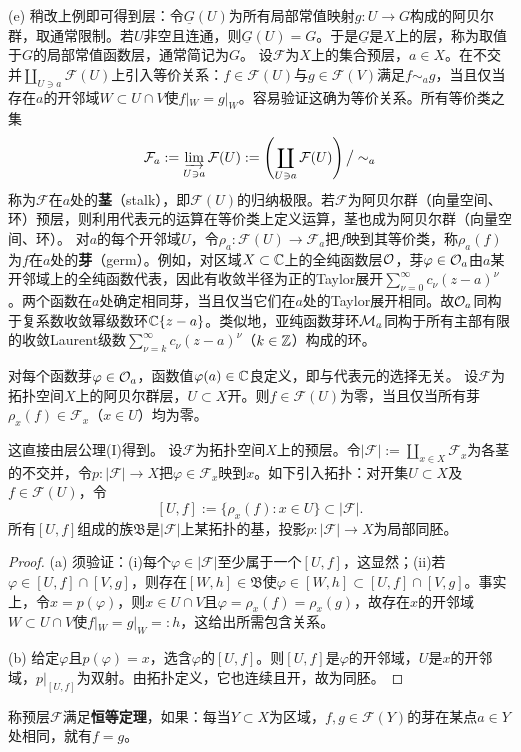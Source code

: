 (e) 稍改上例即可得到层：令$\underline G(U)$为所有局部常值映射$g:U\to G$构成的阿贝尔群，取通常限制。若$U$非空且连通，则$\underline G(U)=G$。于是$\underline G$是$X$上的层，称为取值于$G$的局部常值函数层，通常简记为$G$。
设$\mathcal F$为$X$上的集合预层，$a\in X$。在不交并$\coprod_{U\ni a}\mathcal F(U)$上引入等价关系：$f\in\mathcal F(U)$与$g\in\mathcal F(V)$满足$f\sim_a g$，当且仅当存在$a$的开邻域$W\subset U\cap V$使$f|_W=g|_W$。容易验证这确为等价关系。所有等价类之集
\[
\mathcal F_a:=\varinjlim_{U\ni a}\mathcal F(U):=
\left(\coprod_{U\ni a}\mathcal F(U)\right)\big/\sim_a
\]
称为$\mathcal F$在$a$处的\textbf{茎}（stalk），即$\mathcal F(U)$的归纳极限。若$\mathcal F$为阿贝尔群（向量空间、环）预层，则利用代表元的运算在等价类上定义运算，茎也成为阿贝尔群（向量空间、环）。
对$a$的每个开邻域$U$，令$\rho_a:\mathcal F(U)\to\mathcal F_a$把$f$映到其等价类，称$\rho_a(f)$为$f$在$a$处的\textbf{芽}（germ）。例如，对区域$X\subset\mathbb C$上的全纯函数层$\mathcal O$，芽$\varphi\in\mathcal O_a$由$a$某开邻域上的全纯函数代表，因此有收敛半径为正的Taylor展开$\sum_{\nu=0}^\infty c_\nu(z-a)^\nu$。两个函数在$a$处确定相同芽，当且仅当它们在$a$处的Taylor展开相同。故$\mathcal O_a$同构于复系数收敛幂级数环$\mathbb C\{z-a\}$。类似地，亚纯函数芽环$\mathcal M_a$同构于所有主部有限的收敛Laurent级数$\sum_{\nu=k}^\infty c_\nu(z-a)^\nu$（$k\in\mathbb Z$）构成的环。

对每个函数芽$\varphi\in\mathcal O_a$，函数值$\varphi(a)\in\mathbb C$良定义，即与代表元的选择无关。
设$\mathcal F$为拓扑空间$X$上的阿贝尔群层，$U\subset X$开。则$f\in\mathcal F(U)$为零，当且仅当所有芽$\rho_x(f)\in\mathcal F_x$（$x\in U$）均为零。

这直接由层公理(I)得到。
设$\mathcal F$为拓扑空间$X$上的预层。令$|\mathcal F|:=\coprod_{x\in X}\mathcal F_x$为各茎的不交并，令$p:|\mathcal F|\to X$把$\varphi\in\mathcal F_x$映到$x$。如下引入拓扑：对开集$U\subset X$及$f\in\mathcal F(U)$，令
\[
[U,f]:=\{\rho_x(f):x\in U\}\subset|\mathcal F|.
\]
所有$[U,f]$组成的族$\mathfrak B$是$|\mathcal F|$上某拓扑的基，投影$p:|\mathcal F|\to X$为局部同胚。
\begin{proof}
(a) 须验证：(i)每个$\varphi\in|\mathcal F|$至少属于一个$[U,f]$，这显然；(ii)若$\varphi\in[U,f]\cap[V,g]$，则存在$[W,h]\in\mathfrak B$使$\varphi\in[W,h]\subset[U,f]\cap[V,g]$。事实上，令$x=p(\varphi)$，则$x\in U\cap V$且$\varphi=\rho_x(f)=\rho_x(g)$，故存在$x$的开邻域$W\subset U\cap V$使$f|_W=g|_W=:h$，这给出所需包含关系。

(b) 给定$\varphi$且$p(\varphi)=x$，选含$\varphi$的$[U,f]$。则$[U,f]$是$\varphi$的开邻域，$U$是$x$的开邻域，$p|_{[U,f]}$为双射。由拓扑定义，它也连续且开，故为同胚。
\end{proof}
称预层$\mathcal F$满足\textbf{恒等定理}，如果：每当$Y\subset X$为区域，$f,g\in\mathcal F(Y)$的芽在某点$a\in Y$处相同，就有$f=g$。

